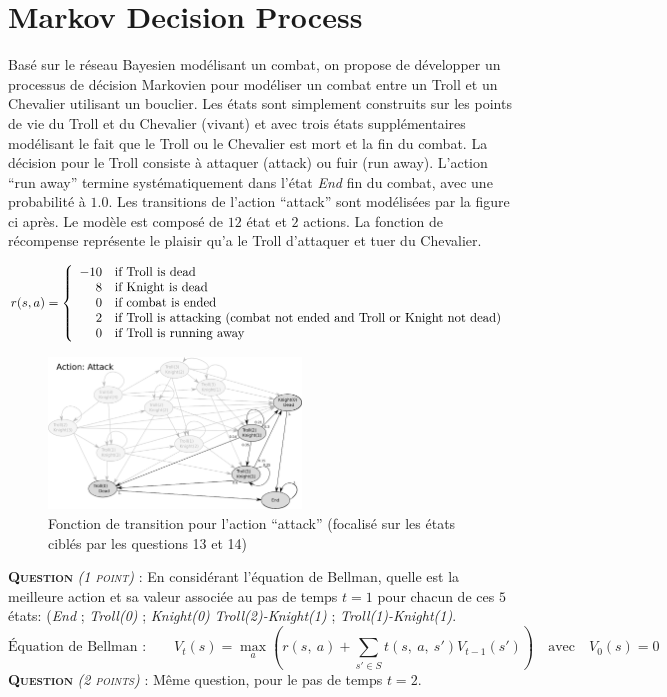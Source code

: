 \documentclass[a4paper, 10pt]{article}
\newcounter{QQ}
\newcommand{\question}[1]{ \medskip \sffamily \textsc{\textbf{\large Question \stepcounter{QQ} \arabic{QQ}} \emph{\small(#1)}} : }
\begin{document}
\section{Markov Decision Process}
  
  Basé sur le réseau Bayesien modélisant un combat, on propose de développer un processus de décision Markovien pour modéliser un combat entre un Troll et un Chevalier utilisant un bouclier.
  Les états sont simplement construits sur les points de vie du Troll et du Chevalier (vivant) et avec trois états supplémentaires modélisant le fait que le Troll ou le Chevalier est mort et la fin du combat.
  La décision pour le Troll consiste à attaquer (attack) ou fuir (run away).
  L'action ``run away'' termine systématiquement dans l'état \emph{End} fin du combat, avec une probabilité à $1.0$.
  Les transitions de l'action ``attack'' sont modélisées par la figure ci après. 
  Le modèle est composé de $12$ état et $2$ actions.
  La fonction de récompense représente le plaisir qu'a le Troll d'attaquer et tuer du Chevalier.
  
  $$ r(s, a)= \left\{
  \begin{array}{r l}
      -10  & \text{if Troll is dead} \\
      8    & \text{if Knight is dead} \\
      0    & \text{if combat is ended} \\
      2    & \text{if Troll is attacking (combat not ended and Troll or Knight not dead)} \\
      0    & \text{if Troll is running away}
   \end{array}
   \right.$$

   \begin{figure}[!b]
    \centering
    \includegraphics[width=0.6\textwidth]{fig/Attacking}
    \caption{Fonction de transition pour l'action ``attack'' (focalisé sur les états ciblés par les questions 13 et 14)}
   \end{figure}

\question{1 point}
  En considérant l'équation de Bellman, quelle est la meilleure action et sa valeur associée au pas de temps $t=1$ pour chacun de ces $5$ états:
  (\emph{End} ; \emph{Troll(0)} ; \emph{Knight(0)}
  \emph{Troll(2)-Knight(1)} ; \emph{Troll(1)-Knight(1)}.
  $$ \text{Équation de Bellman :} \qquad V_t(s)= \max_{a}\left(r(s,\ a) + \sum_{s'\in S} t(s,\ a,\ s') V_{t-1}(s') \right) \quad \text{avec} \quad V_0(s)= 0  $$
\question{2 points} Même question, pour le pas de temps $t=2$.
\end{document}
